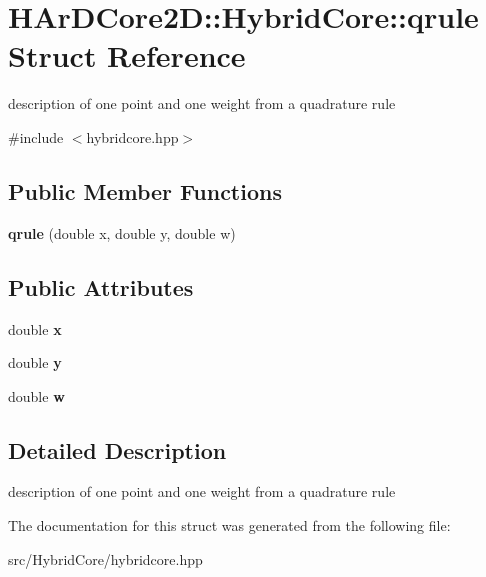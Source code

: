 \hypertarget{structHArDCore2D_1_1HybridCore_1_1qrule}{}\section{H\+Ar\+D\+Core2D\+:\+:Hybrid\+Core\+:\+:qrule Struct Reference}
\label{structHArDCore2D_1_1HybridCore_1_1qrule}


description of one point and one weight from a quadrature rule  




{\ttfamily \#include $<$hybridcore.\+hpp$>$}

\subsection*{Public Member Functions}
\begin{DoxyCompactItemize}
\item 
\mbox{\label{structHArDCore2D_1_1HybridCore_1_1qrule_ae3e8af15fb16e965ae4473ea1b63b91b}} 
{\bfseries qrule} (double x, double y, double w)
\end{DoxyCompactItemize}
\subsection*{Public Attributes}
\begin{DoxyCompactItemize}
\item 
\mbox{\label{structHArDCore2D_1_1HybridCore_1_1qrule_aa0949349d77246716dab1b949b29dcc4}} 
double {\bfseries x}
\item 
\mbox{\label{structHArDCore2D_1_1HybridCore_1_1qrule_a1de7c1f4777b991609cf13fb33ea9cc3}} 
double {\bfseries y}
\item 
\mbox{\label{structHArDCore2D_1_1HybridCore_1_1qrule_ae2dc056e1cd6d7fec1016f697e476890}} 
double {\bfseries w}
\end{DoxyCompactItemize}


\subsection{Detailed Description}
description of one point and one weight from a quadrature rule 

The documentation for this struct was generated from the following file\+:\begin{DoxyCompactItemize}
\item 
src/\+Hybrid\+Core/hybridcore.\+hpp\end{DoxyCompactItemize}
